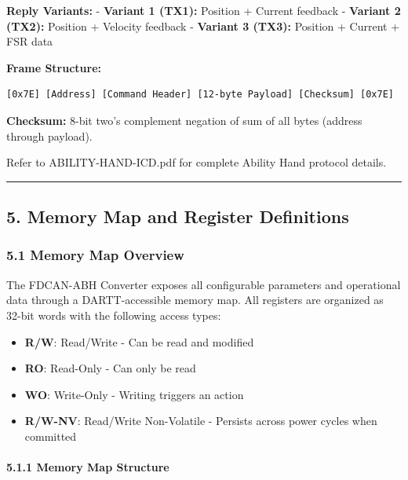 \documentclass[
  11pt,
]{article}
\providecommand{\tightlist}{%
  \setlength{\itemsep}{0pt}\setlength{\parskip}{0pt}}
\begin{document}
\textbf{Reply Variants:} - \textbf{Variant 1 (TX1):} Position + Current
feedback - \textbf{Variant 2 (TX2):} Position + Velocity feedback -
\textbf{Variant 3 (TX3):} Position + Current + FSR data

\textbf{Frame Structure:}

\begin{verbatim}
[0x7E] [Address] [Command Header] [12-byte Payload] [Checksum] [0x7E]
\end{verbatim}

\textbf{Checksum:} 8-bit two's complement negation of sum of all bytes
(address through payload).

Refer to ABILITY-HAND-ICD.pdf for complete Ability Hand protocol
details.

\begin{center}\rule{0.5\linewidth}{0.5pt}\end{center}

\subsection{5. Memory Map and Register
Definitions}\label{memory-map-and-register-definitions}

\subsubsection{5.1 Memory Map Overview}\label{memory-map-overview}

The FDCAN-ABH Converter exposes all configurable parameters and
operational data through a DARTT-accessible memory map. All registers
are organized as 32-bit words with the following access types:

\begin{itemize}
\tightlist
\item
  \textbf{R/W}: Read/Write - Can be read and modified
\item
  \textbf{RO}: Read-Only - Can only be read
\item
  \textbf{WO}: Write-Only - Writing triggers an action
\item
  \textbf{R/W-NV}: Read/Write Non-Volatile - Persists across power
  cycles when committed
\end{itemize}

\paragraph{5.1.1 Memory Map Structure}\label{memory-map-structure}
\end{document}
